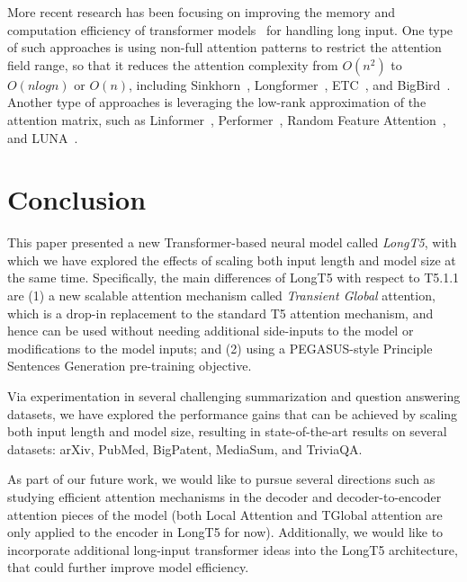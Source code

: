 More recent research has been focusing on improving the memory and computation efficiency of transformer models~\cite{Tay2020EfficientTA,tay2021long} for handling long input. One type of such approaches is using non-full attention patterns to restrict the attention field range, so that it reduces the attention complexity from $O(n^2)$ to $O(n log n)$ or $O(n)$, including Sinkhorn~\cite{Tay2020SparseSA}, Longformer~\cite{Beltagy2020Longformer}, ETC~\cite{etc}, and BigBird~\cite{bigbird}. Another type of approaches is leveraging the low-rank approximation of the attention matrix, such as Linformer~\cite{wang2020linformer}, Performer~\cite{choromanski2021rethinking}, Random Feature Attention~\cite{peng2021random}, and LUNA~\cite{ma2021luna}.

\section{Conclusion}

This paper presented a new Transformer-based neural model called {\em LongT5}, with which we have explored the effects of scaling both input length and model size at the same time. Specifically, the main differences of LongT5 with respect to T5.1.1 are (1) a new scalable attention mechanism called {\em Transient Global} attention, which is a drop-in replacement to the standard T5 attention mechanism, and hence can be used without needing additional side-inputs to the model or modifications to the model inputs; and (2) using a PEGASUS-style Principle Sentences Generation pre-training objective.

Via experimentation in several challenging summarization and question answering datasets, we have explored the performance gains that can be achieved by scaling both input length and model size, resulting in state-of-the-art results on several datasets: arXiv, PubMed, BigPatent, MediaSum, and TriviaQA.

As part of our future work, we would like to pursue several directions such as studying efficient attention mechanisms in the decoder and decoder-to-encoder attention pieces of the model (both Local Attention and TGlobal attention are only applied to the encoder in LongT5 for now). Additionally, we would like to incorporate additional long-input transformer ideas into the LongT5 architecture, that could further improve model efficiency.


